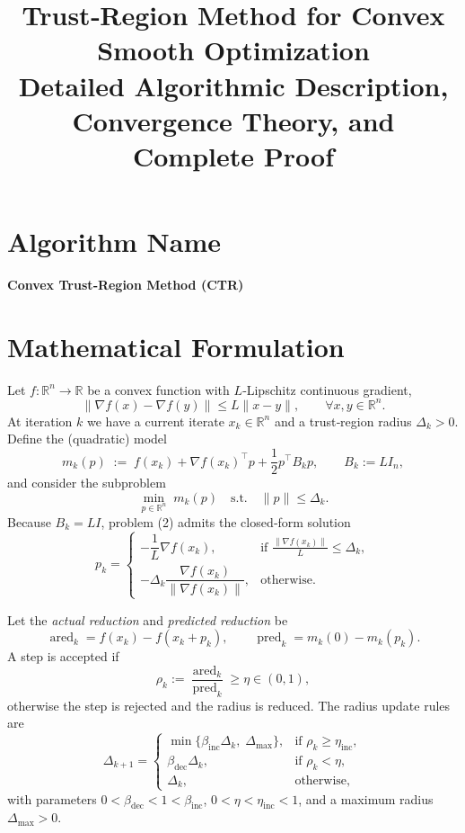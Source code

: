 \documentclass[11pt]{article}
\title{Trust‑Region Method for Convex Smooth Optimization\\
Detailed Algorithmic Description, Convergence Theory, and Complete Proof}
\author{}
\date{}
\begin{document}
\maketitle

\tableofcontents
\newpage

\section*{Algorithm Name}
\begin{center}
\textbf{Convex Trust‑Region Method (CTR)}
\end{center}
\section{Mathematical Formulation}
\label{sec:formulation}
Let $f:\mathbb{R}^{n}\rightarrow\mathbb{R}$ be a convex function with $L$‑Lipschitz continuous gradient,
\[
\|\nabla f(x)-\nabla f(y)\|\le L\|x-y\|,\qquad\forall x,y\in\mathbb{R}^{n}.
\]
At iteration $k$ we have a current iterate $x_{k}\in\mathbb{R}^{n}$ and a trust‑region radius
$\Delta_{k}>0$.  
Define the (quadratic) model
\[
m_{k}(p)\;:=\;f(x_{k})+\nabla f(x_{k})^{\!\top}p+\frac{1}{2}p^{\!\top}B_{k}p,
\qquad B_{k}:=L I_{n},
\tag{1}
\]
and consider the subproblem
\[
\min_{p\in\mathbb{R}^{n}}\; m_{k}(p)\quad\text{s.t.}\quad\|p\|\le\Delta_{k}.
\tag{2}
\]
Because $B_{k}=L I$, problem (2) admits the closed‑form solution
\[
p_{k}= 
\begin{cases}
-\dfrac{1}{L}\nabla f(x_{k}), & \text{if }\displaystyle\frac{\|\nabla f(x_{k})\|}{L}\le\Delta_{k},\\[2ex]
-\Delta_{k}\dfrac{\nabla f(x_{k})}{\|\nabla f(x_{k})\|}, & \text{otherwise}.
\end{cases}
\tag{3}
\]

Let the \emph{actual reduction} and \emph{predicted reduction} be
\[
\operatorname{ared}_{k}=f(x_{k})-f(x_{k}+p_{k}),\qquad
\operatorname{pred}_{k}=m_{k}(0)-m_{k}(p_{k}).
\tag{4}
\]
A step is accepted if
\[
\rho_{k}:=\frac{\operatorname{ared}_{k}}{\operatorname{pred}_{k}}\ge\eta\in(0,1),
\tag{5}
\]
otherwise the step is rejected and the radius is reduced.  
The radius update rules are
\[
\Delta_{k+1}=
\begin{cases}
\min\{\beta_{\text{inc}}\Delta_{k},\;\Delta_{\max}\}, & \text{if }\rho_{k}\ge\eta_{\text{inc}},\\[1ex]
\beta_{\text{dec}}\Delta_{k}, & \text{if }\rho_{k}<\eta,\\[1ex]
\Delta_{k}, & \text{otherwise},
\end{cases}
\tag{6}
\]
with parameters $0<\beta_{\text{dec}}<1<\beta_{\text{inc}}$, $0<\eta<\eta_{\text{inc}}<1$, and a
maximum radius $\Delta_{\max}>0$.
\end{document}
